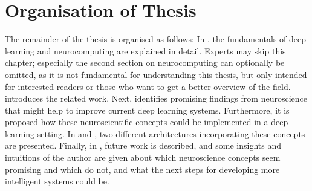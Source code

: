 \section{Organisation of Thesis}
The remainder of the thesis is organised as follows: In , the fundamentals of deep learning and neurocomputing are explained in detail.
Experts may skip this chapter; especially the second section on neurocomputing can optionally be omitted, as it is not fundamental for understanding this thesis, but only intended for interested readers or those who want to get a better overview of the field.
 introduces the related work. Next,  identifies promising findings from neuroscience that might help to improve current deep learning systems. Furthermore, it is proposed how these neuroscientific concepts could be implemented in a deep learning setting.
In  and , two different architectures incorporating these concepts are presented. Finally, in , future work is described, and some insights and intuitions of the author are given about which neuroscience concepts seem promising and which do not, and what the next steps for developing more intelligent systems could be.



